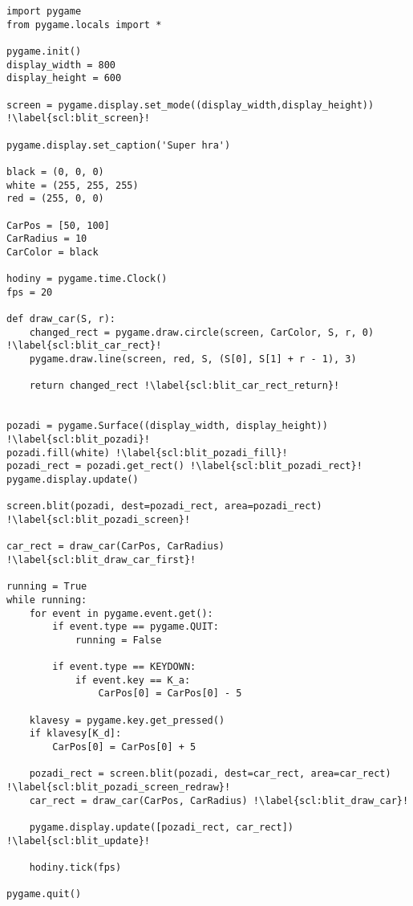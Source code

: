 \begin{minipage}[t]{.45\textwidth}
\begin{code}
\begin{verbatim}
import pygame
from pygame.locals import *

pygame.init()
display_width = 800
display_height = 600

screen = pygame.display.set_mode((display_width,display_height)) !\label{scl:blit_screen}!

pygame.display.set_caption('Super hra')

black = (0, 0, 0)
white = (255, 255, 255)
red = (255, 0, 0)

CarPos = [50, 100]
CarRadius = 10
CarColor = black

hodiny = pygame.time.Clock()
fps = 20

def draw_car(S, r):
    changed_rect = pygame.draw.circle(screen, CarColor, S, r, 0) !\label{scl:blit_car_rect}!
    pygame.draw.line(screen, red, S, (S[0], S[1] + r - 1), 3)
    
    return changed_rect !\label{scl:blit_car_rect_return}!


pozadi = pygame.Surface((display_width, display_height)) !\label{scl:blit_pozadi}!
pozadi.fill(white) !\label{scl:blit_pozadi_fill}!
pozadi_rect = pozadi.get_rect() !\label{scl:blit_pozadi_rect}!
pygame.display.update()

screen.blit(pozadi, dest=pozadi_rect, area=pozadi_rect) !\label{scl:blit_pozadi_screen}!

car_rect = draw_car(CarPos, CarRadius) !\label{scl:blit_draw_car_first}!

running = True
while running:
    for event in pygame.event.get(): 
        if event.type == pygame.QUIT:
            running = False

        if event.type == KEYDOWN:
            if event.key == K_a:
                CarPos[0] = CarPos[0] - 5
                
    klavesy = pygame.key.get_pressed() 
    if klavesy[K_d]:
    	CarPos[0] = CarPos[0] + 5

    pozadi_rect = screen.blit(pozadi, dest=car_rect, area=car_rect) !\label{scl:blit_pozadi_screen_redraw}!
    car_rect = draw_car(CarPos, CarRadius) !\label{scl:blit_draw_car}!
 
    pygame.display.update([pozadi_rect, car_rect]) !\label{scl:blit_update}!
    
    hodiny.tick(fps)

pygame.quit()
\end{verbatim}

\label{code:grafika_blit}
\end{code}
\end{minipage}
